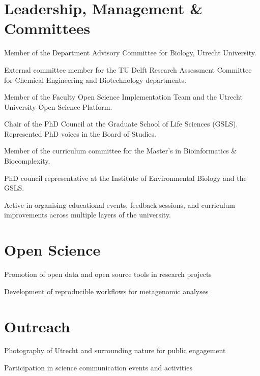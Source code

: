 \documentclass[a4paper,10pt]{article}
\begin{document}
\section*{Leadership, Management \& Committees}
\begin{description}
\raggedright
\item[\normalfont \textcolor{ColorOne}{2023 -- now.}] Member of the Department Advisory Committee for Biology, Utrecht University.
\item[\normalfont \textcolor{ColorOne}{2021.}] External committee member for the TU Delft Research Assessment Committee for Chemical Engineering and Biotechnology departments.
\item[\normalfont \textcolor{ColorOne}{2020 -- 2021.}] Member of the Faculty Open Science Implementation Team and the Utrecht University Open Science Platform.
\item[\normalfont \textcolor{ColorOne}{2019 -- 2021.}] Chair of the PhD Council at the Graduate School of Life Sciences (GSLS). Represented PhD voices in the Board of Studies.
\item[\normalfont \textcolor{ColorOne}{2019 -- 2021.}] Member of the curriculum committee for the Master's in Bioinformatics \& Biocomplexity.
\item[\normalfont \textcolor{ColorOne}{2017 -- 2021.}] PhD council representative at the Institute of Environmental Biology and the GSLS.
\item Active in organising educational events, feedback sessions, and curriculum improvements across multiple layers of the university.
\end{description}

\section*{Open Science}
\begin{description}
\raggedright
\item Promotion of open data and open source tools in research projects
\item Development of reproducible workflows for metagenomic analyses
\end{description}

\section*{Outreach}
\begin{description}
\raggedright
\item Photography of Utrecht and surrounding nature for public engagement
\item Participation in science communication events and activities
\end{description}
\end{document}
